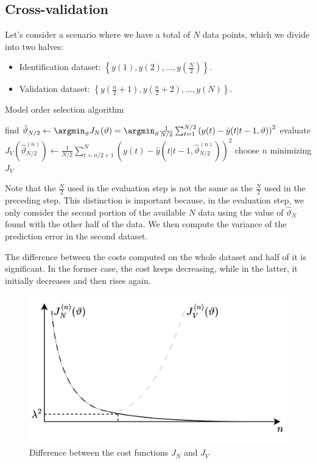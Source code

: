 \subsection{Cross-validation}
Let's consider a scenario where we have a total of $N$ data points, which we divide into two halves:
\begin{itemize}
    \item Identification dataset: $\left\{ y(1),y(2),\dots,y(\frac{N}{2}) \right\}$. 
    \item Validation dataset: $\left\{ y\left(\frac{n}{2}+1\right),y\left(\frac{n}{2}+2\right),\dots,y(N) \right\}$. 
\end{itemize}
\begin{algorithm}[H]
    \caption{Model order selection algorithm}
        \begin{algorithmic}[1]
                \State find $\hat{\vartheta}_{N/2}\leftarrow\argmin_{\vartheta} J_N(\vartheta)=\argmin_{\vartheta}\frac{1}{N/2}\sum_{t=1}^{N/2}\left( y(t)-\hat{y}(t|t-1,\vartheta) \right)^2$
                \State evaluate $J_V\left(\hat{\vartheta}_{N/2}^{(n)}\right) \leftarrow \frac{1}{N/2}\sum_{t=n/2+1}^{N}\left( y(t)-\hat{y}(t|t-1,\hat{\vartheta}_{N/2}^{(n)}) \right)^2$
            \EndFor
            \State choose $n$ minimizing $J_V$
        \end{algorithmic}
\end{algorithm}
Note that the $\frac{N}{2}$ used in the evaluation step is not the same as the $\frac{N}{2}$ used in the preceding step. 
This distinction is important because, in the evaluation step, we only consider the second portion of the available $N$ data using the value of $\hat{\vartheta}_N$ found with the other half of the data. 
We then compute the variance of the prediction error in the second dataset.

The difference between the costs computed on the whole dataset and half of it is significant. 
In the former case, the cost keeps decreasing, while in the latter, it initially decreases and then rises again.
\begin{figure}[H]
    \centering
    \includegraphics[width=0.54\linewidth]{images/fitting1.png}
    \caption{Difference between the cost functions $J_N$ and $J_V$}
\end{figure}

